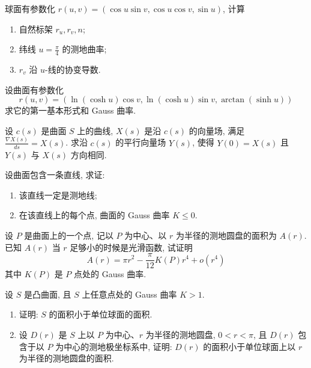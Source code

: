 \documentclass[../../main.tex]{subfiles}
\begin{document}
\begin{problem}
球面有参数化 $r(u, v) = (\cos u \sin v, \cos u \cos v, \sin u)$, 计算
\begin{enumerate}
    \item 自然标架 $r_u, r_v, n$;
    \item 纬线 $u = \frac{\pi}{4}$ 的测地曲率;
    \item $r_v$ 沿 $u$-线的协变导数.
\end{enumerate}
\end{problem}
\begin{problem}
设曲面有参数化
\[ r(u, v) = (\ln(\cosh u) \cos v, \ln(\cosh u) \sin v, \arctan(\sinh u)) \]
求它的第一基本形式和 Gauss 曲率.
\end{problem}
\begin{problem}
设 $c(s)$ 是曲面 $S$ 上的曲线, $X(s)$ 是沿 $c(s)$ 的向量场, 满足 $\frac{\nabla X(s)}{ds} = X(s)$. 求沿 $c(s)$ 的平行向量场 $Y(s)$, 使得 $Y(0) = X(s)$ 且 $Y(s)$ 与 $X(s)$ 方向相同.
\end{problem}
\begin{problem}
设曲面包含一条直线, 求证:
\begin{enumerate}
    \item 该直线一定是测地线;
    \item 在该直线上的每个点, 曲面的 Gauss 曲率 $K \le 0$.
\end{enumerate}
\end{problem}
\begin{problem}
设 $P$ 是曲面上的一个点, 记以 $P$ 为中心、以 $r$ 为半径的测地圆盘的面积为 $A(r)$. 已知 $A(r)$ 当 $r$ 足够小的时候是光滑函数, 试证明
\[ A(r) = \pi r^2 - \frac{\pi}{12} K(P) r^4 + o(r^4) \]
其中 $K(P)$ 是 $P$ 点处的 Gauss 曲率.
\end{problem}
\begin{problem}
设 $S$ 是凸曲面, 且 $S$ 上任意点处的 Gauss 曲率 $K > 1$.
\begin{enumerate}
    \item 证明: $S$ 的面积小于单位球面的面积.
    \item 设 $D(r)$ 是 $S$ 上以 $P$ 为中心、$r$ 为半径的测地圆盘, $0 < r < \pi$, 且 $D(r)$ 包含于以 $P$ 为中心的测地极坐标系中, 证明: $D(r)$ 的面积小于单位球面上以 $r$ 为半径的测地圆盘的面积.
\end{enumerate}
\end{problem}
\end{document}
